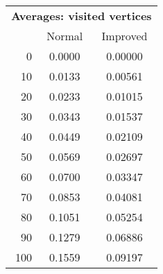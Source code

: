 \begin{tabular}{r|cc}
      \multicolumn{3}{c}{{\bf Averages: visited vertices }} \\
      & Normal & Improved \\ \hline\hline
0
& 0.0000
& 0.00000
\\
10
& 0.0133
& 0.00561
\\
20
& 0.0233
& 0.01015
\\
30
& 0.0343
& 0.01537
\\
40
& 0.0449
& 0.02109
\\
50
& 0.0569
& 0.02697
\\
60
& 0.0700
& 0.03347
\\
70
& 0.0853
& 0.04081
\\
80
& 0.1051
& 0.05254
\\
90
& 0.1279
& 0.06886
\\
100
& 0.1559
& 0.09197
\\
\end{tabular}
